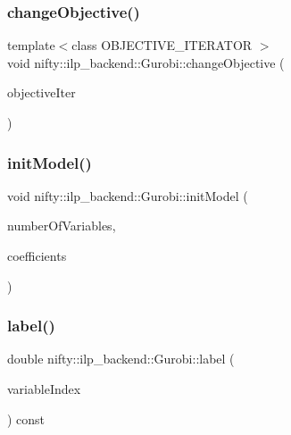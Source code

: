\subsubsection{\texorpdfstring{change\+Objective()}{changeObjective()}}
{\footnotesize\ttfamily template$<$class O\+B\+J\+E\+C\+T\+I\+V\+E\+\_\+\+I\+T\+E\+R\+A\+T\+OR $>$ \\
void nifty\+::ilp\+\_\+backend\+::\+Gurobi\+::change\+Objective (\begin{DoxyParamCaption}\item[{O\+B\+J\+E\+C\+T\+I\+V\+E\+\_\+\+I\+T\+E\+R\+A\+T\+OR}]{objective\+Iter }\end{DoxyParamCaption})\hspace{0.3cm}{\ttfamily [inline]}}

\mbox{\label{classnifty_1_1ilp__backend_1_1Gurobi_ac4ee3e8981df207094a6580f07f2685d}} 
\subsubsection{\texorpdfstring{init\+Model()}{initModel()}}
{\footnotesize\ttfamily void nifty\+::ilp\+\_\+backend\+::\+Gurobi\+::init\+Model (\begin{DoxyParamCaption}\item[{const size\+\_\+t}]{number\+Of\+Variables,  }\item[{const double $\ast$}]{coefficients }\end{DoxyParamCaption})\hspace{0.3cm}{\ttfamily [inline]}}

\mbox{\label{classnifty_1_1ilp__backend_1_1Gurobi_a510a33ec8e49b005e5a2a0802d8e0383}} 
\subsubsection{\texorpdfstring{label()}{label()}}
{\footnotesize\ttfamily double nifty\+::ilp\+\_\+backend\+::\+Gurobi\+::label (\begin{DoxyParamCaption}\item[{const size\+\_\+t}]{variable\+Index }\end{DoxyParamCaption}) const\hspace{0.3cm}{\ttfamily [inline]}}

